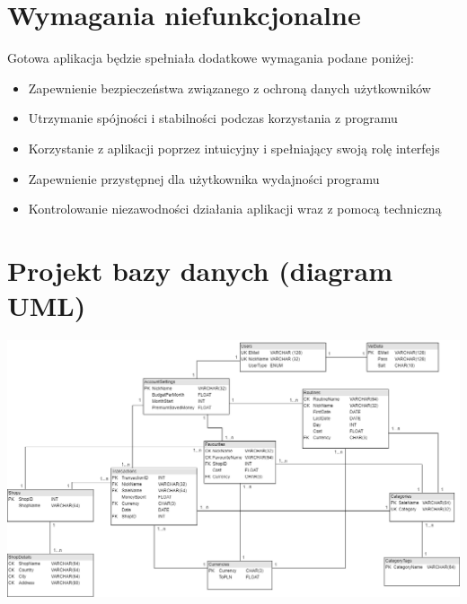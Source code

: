 \documentclass{article}
\begin{document}
    \section{Wymagania niefunkcjonalne}
    Gotowa aplikacja będzie spełniała dodatkowe wymagania podane 
poniżej:
    \begin{itemize}
    \item Zapewnienie bezpieczeństwa związanego z ochroną danych 
użytkowników
    \item Utrzymanie spójności i stabilności podczas korzystania z 
programu
    \item Korzystanie z aplikacji poprzez intuicyjny i spełniający swoją 
rolę interfejs
    \item Zapewnienie przystępnej dla użytkownika wydajności programu
    \item Kontrolowanie niezawodności działania aplikacji wraz z pomocą 
techniczną
    \end{itemize}
    
    \section{Projekt bazy danych (diagram UML)}
    
    \begin{center}
    \includegraphics[width=18cm]{Project.png}
    \end{center}
    
\end{document}
